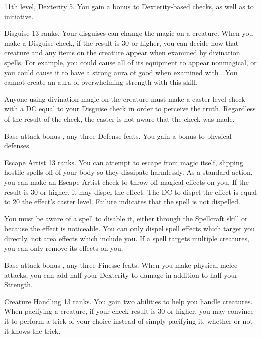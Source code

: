 \featpre 11th level, Dexterity 5.
\featben You gain a  bonus to Dexterity-based checks, as well as to initiative.

\featpre Disguise 13 ranks.
\featben Your disguises can change the magic on a creature. When you make a Disguise check, if the result is 30 or higher, you can decide how that creature and any items on the creature appear when examined by divination spells. For example, you could cause all of its equipment to appear nonmagical, or you could cause it to have a strong aura of good when examined with . You cannot create an aura of overwhelming strength with this skill.

Anyone using divination magic on the creature must make a caster level check with a DC equal to your Disguise check in order to perceive the truth. Regardless of the result of the check, the caster is not aware that the check was made.

\featpre Base attack bonus , any three Defense feats.
\featben You gain a  bonus to physical defenses.

\featpre Escape Artist 13 ranks.
\featben You can attempt to escape from magic itself, slipping hostile spells off of your body so they dissipate harmlessly. As a standard action, you can make an Escape Artist check to throw off magical effects on you. If the result is 30 or higher, it may dispel the effect. The DC to dispel the effect is equal to 20 \add the effect's caster level. Failure indicates that the spell is not dispelled.

You must be aware of a spell to disable it, either through the Spellcraft skill or because the effect is noticeable. You can only dispel spell effects which target you directly, not area effects which include you. If a spell targets multiple creatures, you can only remove its effects on you.

\featpre Base attack bonus , any three Finesse feats.
\featben When you make physical melee attacks, you can add half your Dexterity to damage in addition to half your Strength.

\featpre Creature Handling 13 ranks.
\featben You gain two abilities to help you handle creatures. When pacifying a creature, if your check result is 30 or higher, you may convince it to perform a trick of your choice instead of simply pacifying it, whether or not it knows the trick.


